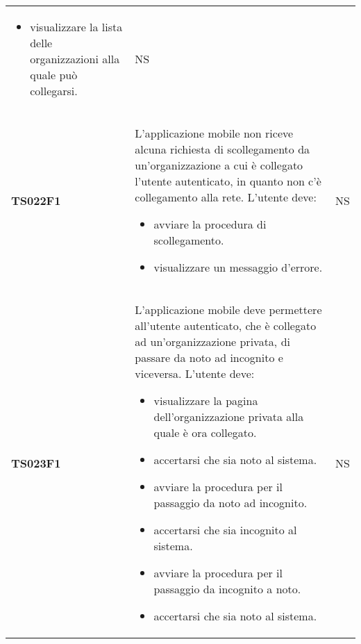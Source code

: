 \documentclass[../piano-di-qualifica.tex]{subfiles}
\begin{document}
\begin{longtable}[H]{>{\centering\bfseries}m{3cm} >{}m{10cm} >{\centering\arraybackslash}m{3cm}}
\begin{itemize}
    \item visualizzare la lista delle organizzazioni alla quale può collegarsi.
  \end{itemize}
                     & NS                                                                                                                                                                                                                                                               \\
  TS022F1            & L'applicazione mobile non riceve alcuna richiesta di scollegamento da un'organizzazione a cui è collegato l'utente autenticato, in quanto non c'è collegamento alla rete. \newline
  L'utente deve:
  \begin{itemize}
    \item avviare la procedura di scollegamento.
    \item visualizzare un messaggio d'errore.
  \end{itemize}
                     & NS                                                                                                                                                                                                                                                               \\
  TS023F1            & L'applicazione mobile deve permettere all'utente autenticato, che è collegato ad un'organizzazione privata, di passare da noto ad incognito e viceversa. \newline
  L'utente deve:
  \begin{itemize}
    \item visualizzare la pagina dell'organizzazione privata alla quale è ora collegato.
    \item accertarsi che sia noto al sistema.
    \item avviare la procedura per il passaggio da noto ad incognito.
    \item accertarsi che sia incognito al sistema.
    \item avviare la procedura per il passaggio da incognito a noto.
    \item accertarsi che sia noto al sistema.
  \end{itemize}
                     & NS                                                                                                                                                                                                                                                               \\

\end{longtable}
\end{document}
